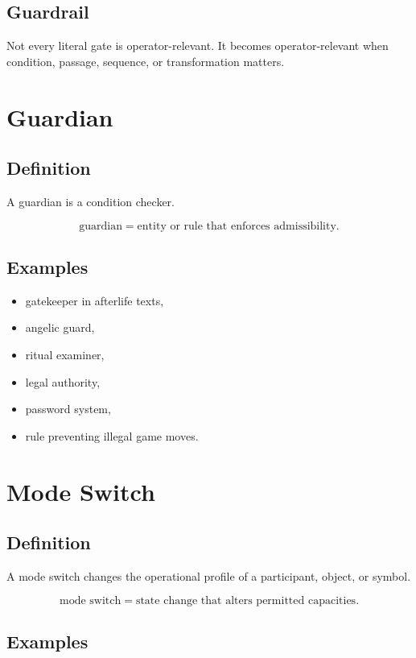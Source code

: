 \documentclass[11pt]{book}
\begin{document}
\subsection*{Guardrail}

Not every literal gate is operator-relevant. It becomes operator-relevant when condition, passage, sequence, or transformation matters.

\section{Guardian}

\subsection*{Definition}

A guardian is a condition checker.

\[
\text{guardian} = \text{entity or rule that enforces admissibility}.
\]

\subsection*{Examples}

\begin{itemize}
    \item gatekeeper in afterlife texts,
    \item angelic guard,
    \item ritual examiner,
    \item legal authority,
    \item password system,
    \item rule preventing illegal game moves.
\end{itemize}

\section{Mode Switch}

\subsection*{Definition}

A mode switch changes the operational profile of a participant, object, or symbol.

\[
\text{mode switch} = \text{state change that alters permitted capacities}.
\]

\subsection*{Examples}
\end{document}
